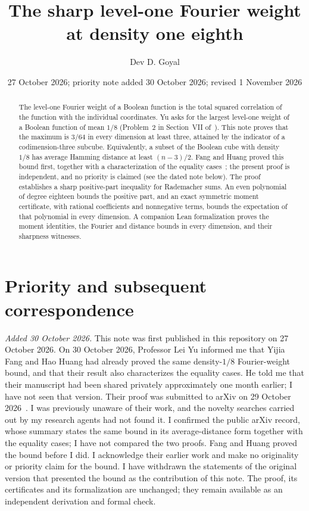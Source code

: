 \documentclass[11pt]{article}
\title{The sharp level-one Fourier weight at density one eighth}
\author{Dev D. Goyal}
\date{27 October 2026; priority note added 30 October 2026; revised 1 November 2026}
\begin{document}
\maketitle
\begin{abstract}
The level-one Fourier weight of a Boolean function is the total squared correlation of the function with the individual coordinates. Yu asks for the largest level-one weight of a Boolean function of mean $1/8$ (Problem~2 in Section~VII of~\cite{Y26}). This note proves that the maximum is $3/64$ in every dimension at least three, attained by the indicator of a codimension-three subcube. Equivalently, a subset of the Boolean cube with density $1/8$ has average Hamming distance at least $(n-3)/2$. Fang and Huang proved this bound first, together with a characterization of the equality cases~\cite{FH26}; the present proof is independent, and no priority is claimed (see the dated note below). The proof establishes a sharp positive-part inequality for Rademacher sums. An even polynomial of degree eighteen bounds the positive part, and an exact symmetric moment certificate, with rational coefficients and nonnegative terms, bounds the expectation of that polynomial in every dimension. A companion Lean formalization proves the moment identities, the Fourier and distance bounds in every dimension, and their sharpness witnesses.
\end{abstract}

\section*{Priority and subsequent correspondence}
\emph{Added 30 October 2026.} This note was first published in this repository on 27 October 2026. On 30 October 2026, Professor Lei Yu informed me that Yijia Fang and Hao Huang had already proved the same density-$1/8$ Fourier-weight bound, and that their result also characterizes the equality cases. He told me that their manuscript had been shared privately approximately one month earlier; I have not seen that version. Their proof was submitted to arXiv on 29 October 2026~\cite{FH26}. I was previously unaware of their work, and the novelty searches carried out by my research agents had not found it. I confirmed the public arXiv record, whose summary states the same bound in its average-distance form together with the equality cases; I have not compared the two proofs. Fang and Huang proved the bound before I did. I acknowledge their earlier work and make no originality or priority claim for the bound. I have withdrawn the statements of the original version that presented the bound as the contribution of this note. The proof, its certificates and its formalization are unchanged; they remain available as an independent derivation and formal check.
\end{document}
